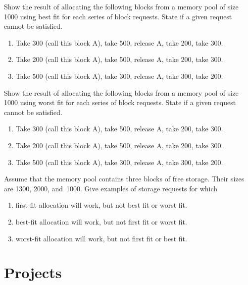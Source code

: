 \begin{exercises}
\item
Show the result of allocating the following blocks from a memory pool
of size 1000 using best fit for each series of block requests.
State if a given request cannot be satisfied.
\begin{enumerate}
\item
Take 300 (call this block A), take 500, release A, take 200, take 300.
\item
Take 200 (call this block A), take 500, release A, take 200, take 300.
\item
Take 500 (call this block A), take 300, release A, take 300, take 200.
\end{enumerate}

\item
Show the result of allocating the following blocks from a memory pool
of size 1000 using worst fit for each series of block requests.
State if a given request cannot be satisfied.
\begin{enumerate}
\item
Take 300 (call this block A), take 500, release A, take 200, take 300.
\item
Take 200 (call this block A), take 500, release A, take 200, take 300.
\item
Take 500 (call this block A), take 300, release A, take 300, take 200.
\end{enumerate}

\item
Assume that the memory pool contains three blocks of free storage.
Their sizes are 1300, 2000,
and~1000.
Give examples of storage requests for which

\begin{enumerate}
\item first-fit allocation will work, but not best fit or worst fit.

\item best-fit allocation will work, but not first fit or worst
fit.

\item worst-fit allocation will work, but not first fit or best
fit.
\end{enumerate}

\end{exercises}

\section{Projects}

